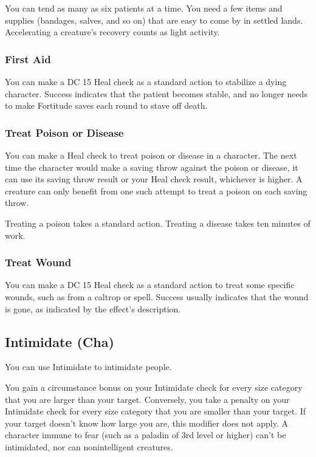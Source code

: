 You can tend as many as six patients at a time. You need a few items and supplies (bandages, salves, and so on) that are easy to come by in settled lands. Accelerating a creature's recovery counts as light activity. %

\subsubsection{First Aid}
You can make a DC 15 Heal check as a standard action to stabilize a dying character. Success indicates that the patient becomes stable, and no longer needs to make Fortitude saves each round to stave off death. 

\subsubsection{Treat Poison or Disease}
You can make a Heal check to treat poison or disease in a character. The next time the character would make a saving throw against the poison or disease, it can use its saving throw result or your Heal check result, whichever is higher. A creature can only benefit from one such attempt to treat a poison on each saving throw.

Treating a poison takes a standard action. Treating a disease takes ten minutes of work.

\subsubsection{Treat Wound}
You can make a DC 15 Heal check as a standard action to treat some specific wounds, such as from a caltrop or  spell. Success usually indicates that the wound is gone, as indicated by the effect's description.

\subsection{Intimidate (Cha)}
You can use Intimidate to intimidate people.

You gain a  circumstance bonus on your Intimidate check for every size category that you are larger than your target. Conversely, you take a  penalty on your Intimidate check for every size category that you are smaller than your target. If your target doesn't know how large you are, this modifier does not apply. A character immune to fear (such as a paladin of 3rd level or higher) can't be intimidated, nor can nonintelligent creatures.

